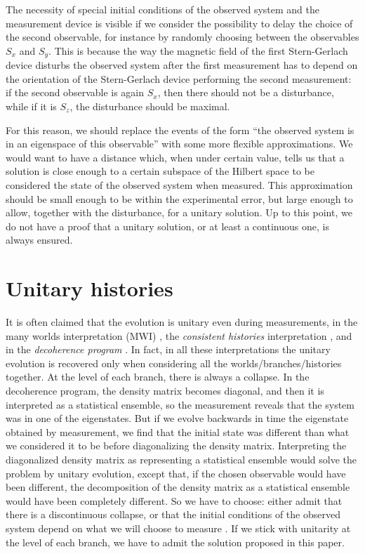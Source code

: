 \documentclass[12pt]{amsart}
\theoremstyle{definition}
\theoremstyle{plain}
\begin{document}
The necessity of special initial conditions of the observed system and the measurement device is visible if we consider the possibility to delay the choice of the second observable, for instance by randomly choosing between the observables $S_x$ and $S_y$. This is because the way the magnetic field of the first Stern-Gerlach device disturbs the observed system after the first measurement has to depend on the orientation of the Stern-Gerlach device performing the second measurement: if the second observable is again $S_x$, then there should not be a disturbance, while if it is $S_z$, the disturbance should be maximal.

For this reason, we should replace the events of the form ``the observed system is in an eigenspace of this observable'' with some more flexible approximations. We would want to have a distance which, when under certain value, tells us that a solution is close enough to a certain subspace of the Hilbert space to be considered the state of the observed system when measured. This approximation should be small enough to be within the experimental error, but large enough to allow, together with the disturbance, for a unitary solution. Up to this point, we do not have a proof that a unitary solution, or at least a continuous one, is always ensured.


\section{Unitary histories}

It is often claimed that the evolution is unitary even during measurements, in the many worlds interpretation (MWI) \cite{Eve57,dWEG73,Vaidman2002MWI}, the \textit{consistent histories} interpretation \cite{Gri84,GH90a,Omn92}, and in the \textit{decoherence program} \cite{Zeh96,Zur98,Zur03a}. In fact, in all these interpretations the unitary evolution is recovered only when considering all the worlds/branches/histories together. At the level of each branch, there is always a collapse. In the decoherence program, the density matrix becomes diagonal, and then it is interpreted as a statistical ensemble, so the measurement reveals that the system was in one of the eigenstates. But if we evolve backwards in time the eigenstate obtained by measurement, we find that the initial state was different than what we considered it to be before diagonalizing the density matrix. Interpreting the diagonalized density matrix as representing a statistical ensemble would solve the problem by unitary evolution, except that, if the chosen observable would have been different, the decomposition of the density matrix as a statistical ensemble would have been completely different. So we have to choose: either admit that there is a discontinuous collapse, or that the initial conditions of the observed system depend on what we will choose to measure \cite{Sto12QMb}. If we stick with unitarity at the level of each branch, we have to admit the solution proposed in this paper.
\end{document}
